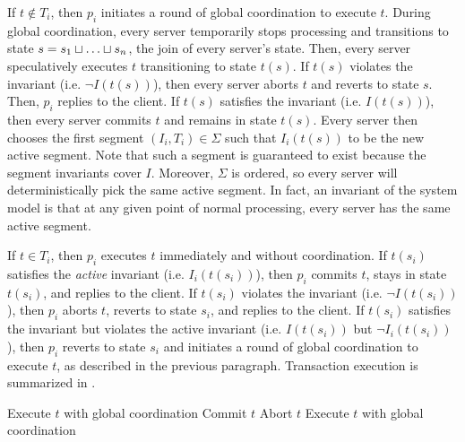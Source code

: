 If $t \notin T_i$, then $p_i$ initiates a round of global coordination to
execute $t$. During global coordination, every server temporarily stops
processing and transitions to state $s = s_1 \sqcup \ldots \sqcup s_n$, the join
of every server's state. Then, every server speculatively executes $t$
transitioning to state $t(s)$. If $t(s)$ violates the invariant (i.e.  $\lnot
I(t(s))$), then every server aborts $t$ and reverts to state $s$.  Then, $p_i$
replies to the client. If $t(s)$ satisfies the invariant (i.e. $I(t(s))$), then
every server commits $t$ and remains in state $t(s)$. Every server then chooses
the first segment $(I_i, T_i) \in \Sigma$ such that $I_i(t(s))$ to be the new
active segment. Note that such a segment is guaranteed to exist because the
segment invariants cover $I$. Moreover, $\Sigma$ is ordered, so every server
will deterministically pick the same active segment. In fact, an invariant of
the system model is that at any given point of normal processing, every server
has the same active segment.

If $t \in T_i$, then $p_i$ executes $t$ immediately and without coordination.
If $t(s_i)$ satisfies the \emph{active} invariant (i.e. $I_i(t(s_i))$), then
$p_i$ commits $t$, stays in state $t(s_i)$, and replies to the client. If
$t(s_i)$ violates the invariant (i.e. $\lnot I(t(s_i))$), then $p_i$ aborts
$t$, reverts to state $s_i$, and replies to the client. If $t(s_i)$ satisfies
the invariant but violates the active invariant (i.e. $I(t(s_i))$ but $\lnot
I_i(t(s_i))$), then $p_i$ reverts to state $s_i$ and initiates a round of
global coordination to execute $t$, as described in the previous paragraph.
Transaction execution is summarized in .

\begin{algorithm}[t]
  \caption{%
    Transaction execution in the segmented \invariantconfluence{} system model}%
  \begin{algorithmic}
      \State Execute $t$ with global coordination
    \Else{}
       Commit $t$
       Abort $t$
      \Else{} Execute $t$ with global coordination
      \EndIf{}
    \EndIf{}
  \end{algorithmic}
\end{algorithm}

